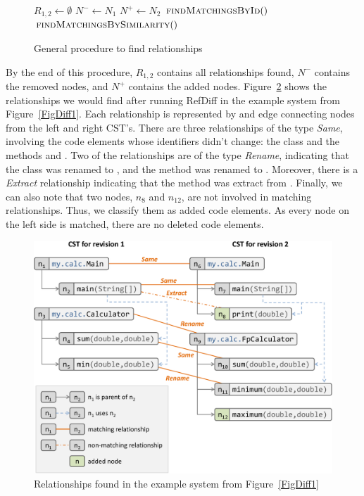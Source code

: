 \begin{figure}[htb]
\begin{algorithmic}[1]
\State $R_{1,2} \gets \emptyset$
\State $N^- \gets N_1$
\State $N^+ \gets N_2$
\State $\textsc{findMatchingsById}()$
\State $\textsc{findMatchingsBySimilarity}()$
\EndProcedure
\end{algorithmic}
\caption{General procedure to find relationships}
\label{AlgoGeneral}
\end{figure}

By the end of this procedure, $R_{1,2}$ contains all relationships found, $N^-$ contains the removed nodes, and $N^+$ contains the added nodes.
Figure~\ref{FigRelationships1} shows the relationships we would find after running RefDiff in the example system from Figure~\ref{FigDiff1}.
Each relationship is represented by and edge connecting nodes from the left and right CST's.
There are three relationships of the type \textit{Same}, involving the code elements whose identifiers didn't change: the class  and the methods  and .
Two of the relationships are of the type \textit{Rename}, indicating that the class  was renamed to , and the method  was renamed to .
Moreover, there is a \textit{Extract} relationship indicating that the method  was extract from .
Finally, we can also note that two nodes, $n_8$ and $n_{12}$, are not involved in matching relationships. Thus, we classify them as added code elements. As every node on the left side is matched, there are no deleted code elements.


\begin{figure}[htb]
\centering
\includegraphics[width=1.0\linewidth]{img/relationshipDiff1.pdf}
\caption{Relationships found in the example system from Figure~\ref{FigDiff1}}
\label{FigRelationships1}
\end{figure}


